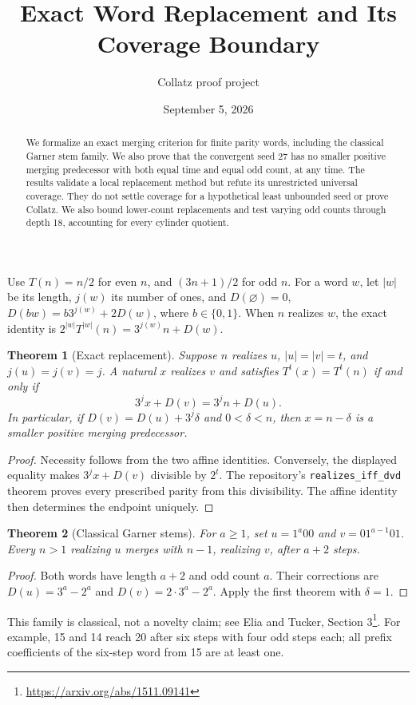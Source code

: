 \documentclass[10pt]{article}
\title{Exact Word Replacement and Its Coverage Boundary}
\author{Collatz proof project}
\date{September 5, 2026}
\newtheorem{theorem}{Theorem}
\begin{document}
\maketitle
\begin{abstract}
We formalize an exact merging criterion for finite parity words, including
the classical Garner stem family. We also prove that the convergent seed
27 has no smaller positive merging predecessor with both equal time and
equal odd count, at any time. The results validate a local replacement
method but refute its unrestricted universal coverage. They do not settle
coverage for a hypothetical least unbounded seed or prove Collatz.
We also bound lower-count replacements and test varying odd counts
through depth 18, accounting for every cylinder quotient.
\end{abstract}
Use $T(n)=n/2$ for even $n$, and $(3n+1)/2$ for odd $n$.
For a word $w$, let $|w|$ be its length, $j(w)$ its number of ones, and
$D(\varnothing)=0$, $D(bw)=b3^{j(w)}+2D(w)$, where $b\in\{0,1\}$.
When $n$ realizes $w$, the exact identity is
$2^{|w|}T^{|w|}(n)=3^{j(w)}n+D(w)$.

\begin{theorem}[Exact replacement]
Suppose $n$ realizes $u$, $|u|=|v|=t$, and $j(u)=j(v)=j$.
A natural $x$ realizes $v$ and satisfies $T^t(x)=T^t(n)$ if and only if
\[
3^jx+D(v)=3^jn+D(u).
\]
In particular, if $D(v)=D(u)+3^j\delta$ and $0<\delta<n$, then
$x=n-\delta$ is a smaller positive merging predecessor.
\end{theorem}
\begin{proof}
Necessity follows from the two affine identities. Conversely, the displayed
equality makes $3^jx+D(v)$ divisible by $2^t$. The repository's
\texttt{realizes\_iff\_dvd} theorem proves every prescribed parity from this
divisibility. The affine identity then determines the endpoint uniquely.
\end{proof}

\begin{theorem}[Classical Garner stems]
For $a\geq1$, set $u=1^a00$ and $v=01^{a-1}01$. Every $n>1$ realizing
$u$ merges with $n-1$, realizing $v$, after $a+2$ steps.
\end{theorem}
\begin{proof}
Both words have length $a+2$ and odd count $a$.
Their corrections are $D(u)=3^a-2^a$ and $D(v)=2\cdot3^a-2^a$.
Apply the first theorem with $\delta=1$.
\end{proof}
This family is classical, not a novelty claim; see Elia and Tucker,
Section 3\footnote{\url{https://arxiv.org/abs/1511.09141}}.
For example, 15 and 14 reach 20 after six steps with four odd steps each;
all prefix coefficients of the six-step word from 15 are at least one.
\end{document}
